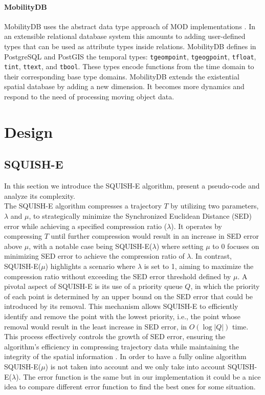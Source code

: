 \documentclass[twoside,12pt, a4paper]{report}
\begin{document}
\subsubsection{MobilityDB}
MobilityDB uses the abstract data type approach of MOD implementations
\cite{guting2000foundation}. In an extensible relational database system this
amounts to adding user-defined types that can be used as attribute
types inside relations. MobilityDB defines in PostgreSQL and PostGIS
the temporal types: \texttt{tgeompoint}, \texttt{tgeogpoint}, \texttt{tfloat}, \texttt{tint},
\texttt{ttext}, and \texttt{tbool}. These types encode functions from the time
domain to their corresponding base type domains. MobilityDB extends the existential
spatial database by adding a new dimension. It becomes more dynamics and respond to the need 
of processing moving object data. 


\chapter{Design}
\section{SQUISH-E}
In this section we introduce the SQUISH-E algorithm, present a pseudo-code and analyze its complexity. \\

The SQUISH-E algorithm compresses a trajectory \(T\) by utilizing two parameters, \(\lambda\) and \(\mu\), to strategically minimize the Synchronized Euclidean Distance (SED) error while achieving a specified compression ratio (\(\lambda\)). It operates by compressing \(T\) until further compression would result in an increase in SED error above \(\mu\), with a notable case being SQUISH-E(\(\lambda\)) where setting \(\mu\) to 0 focuses on minimizing SED error to achieve the compression ratio of \(\lambda\). In contrast, SQUISH-E(\(\mu\)) highlights a scenario where \(\lambda\) is set to 1, aiming to maximize the compression ratio without exceeding the SED error threshold defined by \(\mu\). A pivotal aspect of SQUISH-E is its use of a priority queue \(Q\), in which the priority of each point is determined by an upper bound on the SED error that could be introduced by its removal. This mechanism allows SQUISH-E to efficiently identify and remove the point with the lowest priority, i.e., the point whose removal would result in the least increase in SED error, in \(O(\log |Q|)\) time. This process effectively controls the growth of SED error, ensuring the algorithm's efficiency in compressing trajectory data while maintaining the integrity of the spatial information \cite{muckell2014compression}. In order to have a fully online algorithm SQUISH-E(\(\mu\)) is not taken into account and we only take into account SQUISH-E(\(\lambda\)). The error function is the same but in our implementation it could be a nice idea to compare different error function to find the best ones for some situation.
\end{document}
